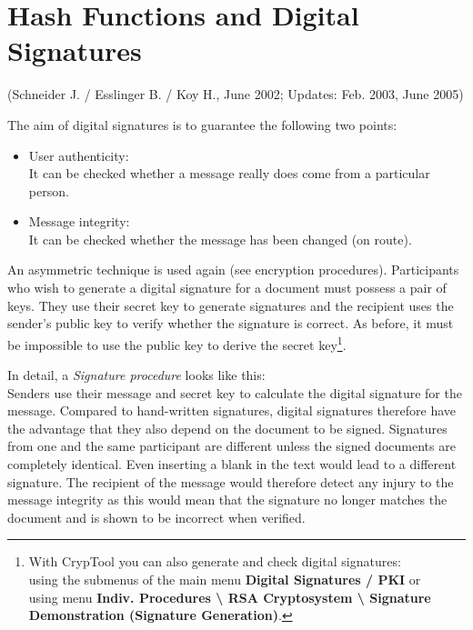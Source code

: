 
\newpage
\hypertarget{Chapter_Hashes-and-Digital-Signatures}{}
\section{Hash Functions and Digital Signatures}
\label{Chapter_Hashes-and-Digital-Signatures}
(Schneider J. / Esslinger B. / Koy H., June 2002;
Updates: Feb. 2003, June 2005)

\vspace{12pt}
The aim of digital signatures is to guarantee the following two points:
\begin{itemize}
 \item User authenticity:  \\
      It can be checked whether a message really does
come from a particular person.
 \item Message integrity:   \\
      It can be checked whether the message has been
changed (on route).
\end{itemize}


An asymmetric technique is used again (see encryption procedures). Participants
who wish to generate a digital signature for a document must possess a pair of
keys. They use their secret key to generate signatures and the recipient uses
the sender's public key to verify whether the signature is correct. As before,
it must be impossible to use the public key to derive the secret key\footnote{%
With CrypTool you can also generate and check 
digital signatures: \\
using the submenus of the main menu {\bf Digital Signatures / PKI} or \\
using menu {\bf Indiv. Procedures \textbackslash{} RSA Cryptosystem 
\textbackslash{} Signature Demonstration (Signature Generation)}.
}.


In detail, a  {\em Signature procedure} looks like
this: \\ Senders use their message and secret key to calculate the digital
signature for the message. Compared to hand-written signatures, digital
signatures therefore have the advantage that they also depend on the document to
be signed. Signatures from one and the same participant are different unless the
signed documents are completely identical. Even inserting a blank in the text
would lead to a different signature. The recipient of the message would
therefore detect any injury to the message integrity as this would mean that the
signature no longer matches the document and is shown to be incorrect when
verified.

